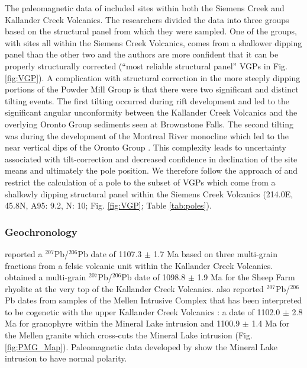 \documentclass[11pt,letterpaper]{article}
\begin{document}
The paleomagnetic data of \citet{Palmer1986a} included sites within both the Siemens Creek and Kallander Creek Volcanics. The researchers divided the data into three groups based on the structural panel from which they were sampled. One of the groups, with sites all within the Siemens Creek Volcanics, comes from a shallower dipping panel than the other two and the authors are more confident that it can be properly structurally corrected (``most reliable structural panel'' VGPs in Fig. \ref{fig:VGP}). A complication with structural correction in the more steeply dipping portions of the Powder Mill Group is that there were two significant and distinct tilting events. The first tilting occurred during rift development and led to the significant angular unconformity between the Kallander Creek Volcanics and the overlying Oronto Group sediments seen at Brownstone Falls. The second tilting was during the development of the Montreal River monocline which led to the near vertical dips of the Oronto Group \citep{Cannon1993a}. This complexity leads to uncertainty associated with tilt-correction and decreased confidence in declination of the site means and ultimately the pole position. We therefore follow the approach of \citet{Palmer1986a} and restrict the calculation of a pole to the subset of VGPs which come from a shallowly dipping structural panel within the Siemens Creek Volcanics (214.0\textdegree E, 45.8\textdegree N, A95: 9.2\textdegree, N: 10; Fig. \ref{fig:VGP}; Table \ref{tab:poles}).

\subsubsection{Geochronology}

\cite{Davis1997a} reported a $^{207}$Pb/$^{206}$Pb date of 1107.3 $\pm$ 1.7 Ma based on three multi-grain fractions from a felsic volcanic unit within the Kallander Creek Volcanics. \cite{Zartman1997a} obtained a multi-grain $^{207}$Pb/$^{206}$Pb date of 1098.8 $\pm$ 1.9 Ma for the Sheep Farm rhyolite at the very top of the Kallander Creek Volcanics. \cite{Zartman1997a} also reported $^{207}$Pb/$^{206}$Pb dates from samples of the Mellen Intrusive Complex that has been interpreted to be cogenetic with the upper Kallander Creek Volcanics \citep{Cannon1993b}: a date of 1102.0 $\pm$ 2.8 Ma for granophyre within the Mineral Lake intrusion and 1100.9 $\pm$ 1.4 Ma for the Mellen granite which cross-cuts the Mineral Lake intrusion (Fig. \ref{fig:PMG_Map}). Paleomagnetic data developed by \cite{Books1966a} show the Mineral Lake intrusion to have normal polarity.
\end{document}
